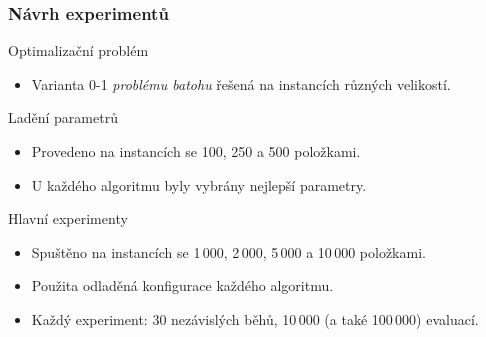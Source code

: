 \begin{frame}
  \frametitle{Návrh experimentů}
  \small
  \begin{block}{Optimalizační problém}
    \begin{itemize}
      \item Varianta 0-1 \emph{problému batohu} řešená na instancích různých velikostí.
    \end{itemize}
  \end{block}

  \begin{block}{Ladění parametrů}
    \begin{itemize}
      \item Provedeno na instancích se 100, 250 a 500 položkami.
      \item U každého algoritmu byly vybrány nejlepší parametry.
    \end{itemize}
  \end{block}

  \begin{block}{Hlavní experimenty}
    \begin{itemize}
      \item Spuštěno na instancích se 1\,000, 2\,000, 5\,000 a 10\,000 položkami.
      \item Použita odladěná konfigurace každého algoritmu.
      \item Každý experiment: 30 nezávislých běhů, 10\,000 (a také 100\,000) evaluací.
    \end{itemize}
  \end{block}
\end{frame}


